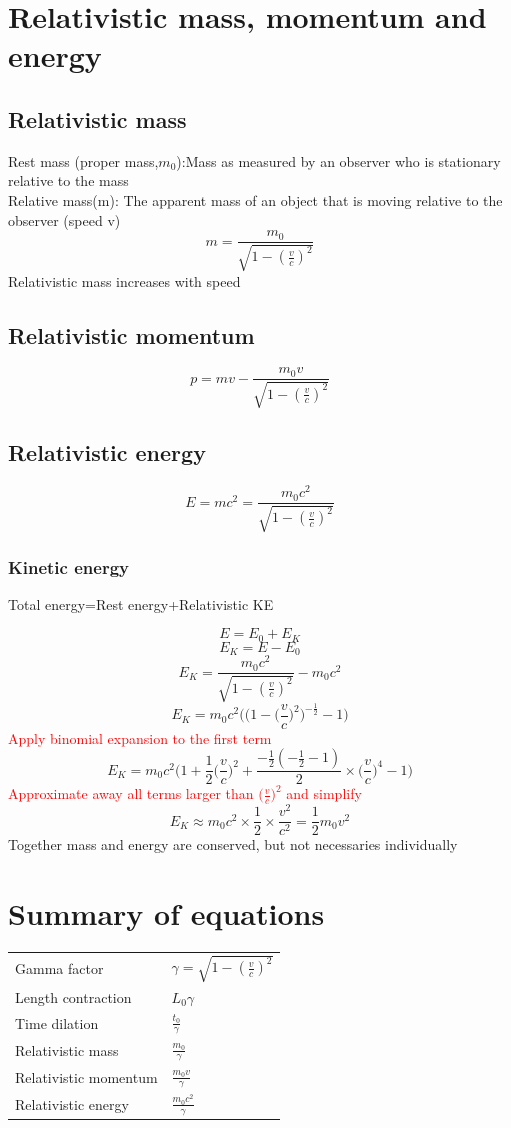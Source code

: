 \documentclass[12pt]{article}
\begin{document}
\section{Relativistic mass, momentum and energy}
\subsection{Relativistic mass}
Rest mass (proper mass,$m_0$):Mass as measured by an observer who is stationary relative to the mass\\
Relative mass(m): The apparent mass of an object that is moving relative to the observer (speed v)\\
$$m=\frac{m_0}{\sqrt{1-(\frac{v}{c})^2}}$$
Relativistic mass increases with speed
\newpage
\subsection{Relativistic momentum}
$$p=mv-\frac{m_0v}{\sqrt{1-(\frac{v}{c})^2}}$$
\subsection{Relativistic energy}
$$E=mc^2=\frac{m_0c^2}{\sqrt{1-(\frac{v}{c})^2}}$$
\subsubsection{Kinetic energy}
\begin{center}
Total energy=Rest energy+Relativistic KE
\end{center}
$$E=E_0+E_K$$
$$E_K=E-E_0$$
$$E_K=\frac{m_0c^2}{\sqrt{1-(\frac{v}{c})^2}}-m_0c^2$$
$$E_K=m_0c^2\Bigg(\bigg(1-\bigg(\frac{v}{c}\bigg)^2\bigg)^{-\frac{1}{2}}-1\Bigg)$$
\textcolor{red}{Apply binomial expansion to the first term}
$$E_K=m_0c^2\Bigg(1+\frac{1}{2}\Big(\frac{v}{c}\Big)^2+\frac{-\frac{1}{2}(-\frac{1}{2}-1)}{2}\times\Big(\frac{v}{c}\Big)^4-1\Bigg)$$
\textcolor{red}{Approximate away all terms larger than $\Big(\frac{v}{c}\Big)^2$ and simplify}
$$E_K\approx m_0c^2\times\frac{1}{2}\times\frac{v^2}{c^2}=\frac{1}{2}m_0v^2$$
Together mass and energy are conserved, but not necessaries individually
\section{Summary of equations}
{\renewcommand{\arraystretch}{2}
\begin{tabular}{l l}
Gamma factor&$\gamma=\sqrt{1-(\frac{v}{c})^2}$\\
Length contraction&$L_0\gamma$\\
Time dilation&\Large{$\frac{t_0}{\gamma}$}\\
Relativistic mass&\Large{$\frac{m_0}{\gamma}$}\\
Relativistic momentum&\Large{$\frac{m_0v}{\gamma}$}\\
Relativistic energy&\Large{$\frac{m_0c^2}{\gamma}$}
\end{tabular}}
\end{document}
